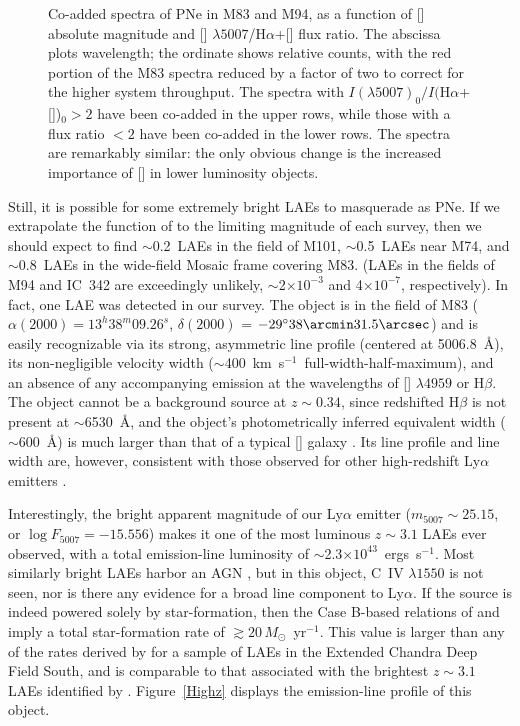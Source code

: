 \documentclass[12pt,preprint]{emulateapj}
\newcommand{\eg}{{e.g.,}}
\newcommand{\kms}{km~s$^{-1}$}
\begin{document}
\begin{figure}
\caption{Co-added spectra of PNe in M83 and M94, as a function of [] absolute magnitude and [] $\lambda 5007$/H$\alpha$+[] flux ratio.  The abscissa plots wavelength; the ordinate shows relative counts, with the red portion of the M83 spectra reduced by a factor of two to correct for the higher system throughput.  The spectra with $I(\lambda5007)_0/I($H$\alpha$+[])$_0 > 2$ have been co-added in the upper rows, while those with a flux ratio $< 2$ have been co-added in the lower rows.  The spectra are remarkably similar:  the only obvious change is the increased importance of [] in lower luminosity objects. \label{CoAdd} }
\end{figure}

Still, it is possible for some extremely bright LAEs to masquerade as PNe.  If we extrapolate the \citet{schechter} function of \citet{gronwall} to the limiting magnitude of each survey, then we should expect to find $\sim$0.2~LAEs in the field of M101, $\sim$0.5~LAEs near M74, and $\sim$0.8~LAEs in the wide-field Mosaic frame covering M83.  (LAEs in the fields of M94 and IC~342 are exceedingly unlikely, $\sim$2$\times 10^{-3}$ and 4$\times 10^{-7}$, respectively).  In fact, one LAE was detected in our survey.  The object is in the field of M83 ($\alpha(2000) = 13^h38^m09.26^s$, $\delta(2000)$ = $-29^{\circ}38\arcmin31.5\arcsec$) and is easily recognizable via its strong, asymmetric line profile (centered at 5006.8~\AA), its non-negligible velocity width ($\sim$400~\kms\ full-width-half-maximum), and an absence of any accompanying emission at the wavelengths of [] $\lambda 4959$ or H$\beta$.  The object cannot be a background source at $z \sim 0.34$, since redshifted H$\beta$ is not present at $\sim$6530~\AA, and the object's photometrically inferred equivalent width ($\sim$600~\AA) is much larger than that of a typical [] galaxy \citep{hogg98}.  Its line profile and line width are, however, consistent with those observed for other high-redshift Ly$\alpha$ emitters \citep[\eg][]{dawson}. 

Interestingly, the bright apparent magnitude of our Ly$\alpha$ emitter ($m_{5007} \sim 25.15$, or $\log F_{5007} = -15.556$) makes it one of the most luminous $z \sim 3.1$ LAEs ever observed, with a total emission-line luminosity of $\sim$2.3$\times 10^{43}$~ergs~s$^{-1}$.  Most similarly bright LAEs harbor an AGN \citep{gronwall, ouchi}, but in this object, C~IV $\lambda 1550$ is not seen, nor is there any evidence for a broad line component to Ly$\alpha$.  If the source is indeed powered solely by star-formation, then the Case B-based relations of \citet{kennicutt} and \citet{hu} imply a total star-formation rate of $\gtrsim 20 \, M_{\odot}$~yr$^{-1}$.  This value is larger than any of the rates derived by \citet{gronwall} for a sample of LAEs in the Extended Chandra Deep Field South, and is comparable to that associated with the brightest $z \sim 3.1$ LAEs identified by \citet{ouchi}.  Figure~\ref{Highz} displays the emission-line profile of this object.
\end{document}
